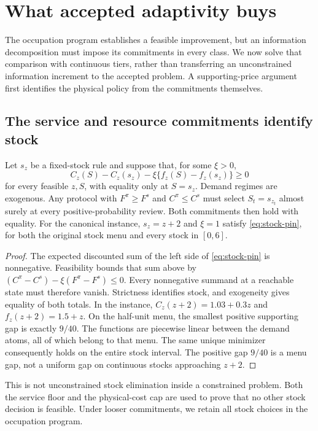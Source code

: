 \section{What accepted adaptivity buys}\label{sec:accepted-continuous}
The occupation program establishes a feasible improvement, but an information decomposition must impose its commitments in every class. We now solve that comparison with continuous tiers, rather than transferring an unconstrained information increment to the accepted problem. A supporting-price argument first identifies the physical policy from the commitments themselves.

\subsection{The service and resource commitments identify stock}
\begin{lemma}\label{lem:stock-pin}
Let $s_z$ be a fixed-stock rule and suppose that, for some $\xi>0$,
\begin{equation}\label{eq:stock-pin}
 C_z(S)-C_z(s_z)-\xi\{f_z(S)-f_z(s_z)\}\geq0
\end{equation}
for every feasible $z,S$, with equality only at $S=s_z$. Demand regimes are exogenous. Any protocol with $F^\pi\geq F^s$ and $C^\pi\leq C^s$ must select $S_t=s_{z_t}$ almost surely at every positive-probability review. Both commitments then hold with equality. For the canonical instance, $s_z=z+2$ and $\xi=1$ satisfy \eqref{eq:stock-pin}, for both the original stock menu and every stock in $[0,6]$.
\end{lemma}
\begin{proof}
The expected discounted sum of the left side of \eqref{eq:stock-pin} is nonnegative. Feasibility bounds that sum above by $(C^\pi-C^s)-\xi(F^\pi-F^s)\leq0$. Every nonnegative summand at a reachable state must therefore vanish. Strictness identifies stock, and exogeneity gives equality of both totals. In the instance, $C_z(z+2)=1.03+0.3z$ and $f_z(z+2)=1.5+z$. On the half-unit menu, the smallest positive supporting gap is exactly $9/40$. The functions are piecewise linear between the demand atoms, all of which belong to that menu. The same unique minimizer consequently holds on the entire stock interval. The positive gap $9/40$ is a menu gap, not a uniform gap on continuous stocks approaching $z+2$.
\end{proof}
This is not unconstrained stock elimination inside a constrained problem. Both the service floor and the physical-cost cap are used to prove that no other stock decision is feasible. Under looser commitments, we retain all stock choices in the occupation program.

